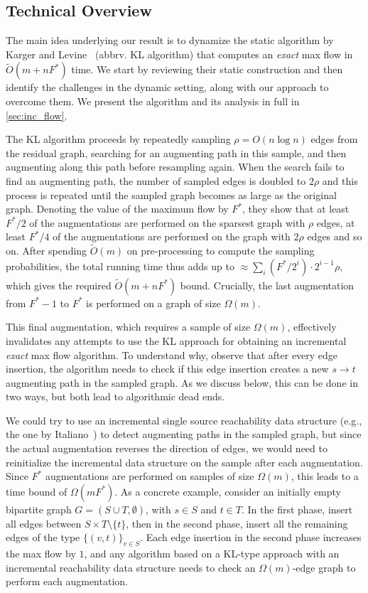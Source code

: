 \documentclass[11pt,a4paper]{article}
\newcommand{\tO}{\ensuremath{\widetilde O}}
\begin{document}
\subsection{Technical Overview}
\label{sec:tech_overview}

The main idea underlying our result is to dynamize the static algorithm by Karger and Levine~\cite{KL15sampling} (abbrv. KL algorithm) that computes an \emph{exact} max flow in $\tO(m + nF^*)$ time. We start by reviewing their static construction and then identify the challenges in the dynamic setting, along with our approach to overcome them. We present the algorithm and its analysis in full in \cref{sec:inc_flow}.

The KL algorithm proceeds by repeatedly sampling $\rho = O(n \log n)$ edges from the residual graph, searching for an augmenting path in this sample, and then augmenting along this path before resampling again. When the search fails to find an augmenting path, the number of sampled edges is doubled to $2\rho$ and this process is repeated until the sampled graph becomes as large as the original graph.
Denoting the value of the maximum flow by $F^*$, they show that at least $F^*/2$ of the augmentations are performed on the sparsest graph with $\rho$ edges, at least $F^*/4$ of the augmentations are performed on the graph with $2\rho$ edges and so on.
After spending $\tO(m)$ on pre-processing to compute the sampling probabilities, the total running time thus adds up to $ \approx \sum_i (F^* /2^i) \cdot 2^{i-1} \rho$, which gives the required $\tO(m + nF^*)$ bound. Crucially, the last augmentation from $F^*-1$ to $F^*$ is performed on a graph of size $\Omega(m)$.

This final augmentation, which requires a sample of size $\Omega(m)$, effectively invalidates any attempts to use the KL approach for obtaining an incremental \emph{exact} max flow algorithm. To understand why, observe that after every edge insertion, the algorithm needs to check if this edge insertion creates a new $s\to t$ augmenting path in the sampled graph. As we discuss below, this can be done in two ways, but both lead to algorithmic dead ends.

We could try to use an incremental single source reachability data structure (e.g., the one by Italiano~\cite{Ita86incdirected}) to detect augmenting paths in the sampled graph, but since the actual augmentation reverses the direction of edges, we would need to reinitialize the incremental data structure on the sample after each augmentation. Since $F^*$ augmentations are performed on samples of size $\Omega(m)$, this leads to a time bound of $\Omega(mF^*)$.
As a concrete example, consider an initially empty bipartite graph $G = (S \cup T, \emptyset)$, with $s \in S$ and $t \in T$. In the first phase, insert all edges between $S \times T \setminus \{ t \}$, then in the second phase, insert all the remaining edges of the type $\{(v, t)  \}_{v \in S}$. Each edge insertion in the second phase increases the max flow by $1$, and any algorithm based on a KL-type approach with an incremental reachability data structure needs to check an $\Omega(m)$-edge graph to perform each augmentation.
\end{document}
